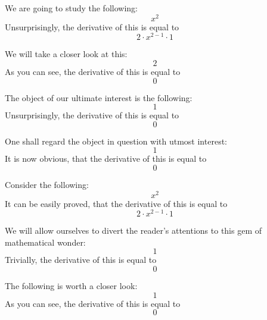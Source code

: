 \documentclass{article}
\begin{document}
We are going to study the following:
\begin{equation}
x ^{2 } 
\end{equation}
Unsurprisingly, the derivative of this is equal to
\begin{equation}
2 \cdot x ^{2 - 1 } \cdot 1 
\end{equation}

We will take a closer look at this:
\begin{equation}
2 
\end{equation}
As you can see, the derivative of this is equal to
\begin{equation}
0 
\end{equation}

The object of our ultimate interest is the following:
\begin{equation}
1 
\end{equation}
Unsurprisingly, the derivative of this is equal to
\begin{equation}
0 
\end{equation}

One shall regard the object in question with utmost interest:
\begin{equation}
1 
\end{equation}
It is now obvious, that the derivative of this is equal to
\begin{equation}
0 
\end{equation}

Consider the following:
\begin{equation}
x ^{2 } 
\end{equation}
It can be easily proved, that the derivative of this is equal to
\begin{equation}
2 \cdot x ^{2 - 1 } \cdot 1 
\end{equation}

We will allow ourselves to divert the reader's attentions to this gem of mathematical wonder:
\begin{equation}
1 
\end{equation}
Trivially, the derivative of this is equal to
\begin{equation}
0 
\end{equation}

The following is worth a closer look:
\begin{equation}
1 
\end{equation}
As you can see, the derivative of this is equal to
\begin{equation}
0 
\end{equation}
\end{document}
